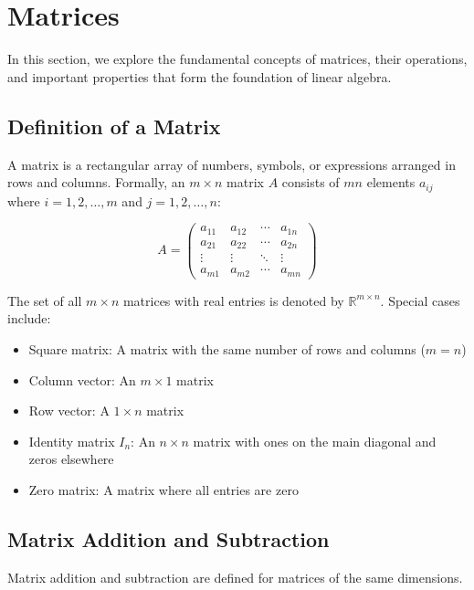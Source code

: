 \section{Matrices}

In this section, we explore the fundamental concepts of matrices, their operations, and important properties that form the foundation of linear algebra.

\subsection{Definition of a Matrix}

A matrix is a rectangular array of numbers, symbols, or expressions arranged in rows and columns. Formally, an $m \times n$ matrix $A$ consists of $mn$ elements $a_{ij}$ where $i = 1, 2, \ldots, m$ and $j = 1, 2, \ldots, n$:

\begin{equation*}
A = 
\begin{pmatrix}
a_{11} & a_{12} & \cdots & a_{1n} \\
a_{21} & a_{22} & \cdots & a_{2n} \\
\vdots & \vdots & \ddots & \vdots \\
a_{m1} & a_{m2} & \cdots & a_{mn}
\end{pmatrix}
\end{equation*}

The set of all $m \times n$ matrices with real entries is denoted by $\mathbb{R}^{m \times n}$. Special cases include:
\begin{itemize}[label=$-$]
    \item Square matrix: A matrix with the same number of rows and columns ($m = n$)
    \item Column vector: An $m \times 1$ matrix
    \item Row vector: A $1 \times n$ matrix
    \item Identity matrix $I_n$: An $n \times n$ matrix with ones on the main diagonal and zeros elsewhere
    \item Zero matrix: A matrix where all entries are zero
\end{itemize}

\subsection{Matrix Addition and Subtraction}

Matrix addition and subtraction are defined for matrices of the same dimensions.


